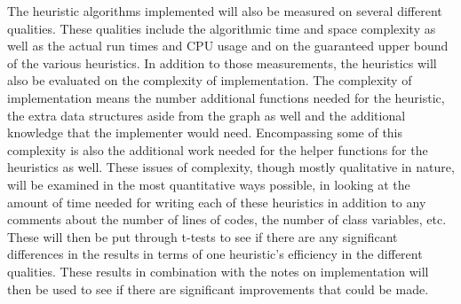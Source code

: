 \documentclass[midd]{thesis}
\newcommand{\tab}{\hspace*{2em}}
\begin{document}
\tab The heuristic algorithms implemented will also be measured on several different qualities. These qualities include the algorithmic time and space complexity as well as the actual run times and CPU usage and on the guaranteed upper bound of the various heuristics. In addition to those measurements, the heuristics will also be evaluated on the complexity of implementation. The complexity of implementation means the number additional functions needed for the heuristic, the extra data structures aside from the graph as well and the additional knowledge that the implementer would need. Encompassing some of this complexity is also the additional work needed for the helper functions for the heuristics as well. These issues of complexity, though mostly qualitative in nature, will be examined in the most quantitative ways possible, in looking at the amount of time needed for writing each of these heuristics in addition to any comments about the number of lines of codes, the number of class variables, etc. These will then be put through t-tests to see if there are any significant differences in the results in terms of one heuristic's efficiency in the different qualities. These results in combination with the notes on implementation will then be used to see if there are significant improvements that could be made.\\
\end{document}
